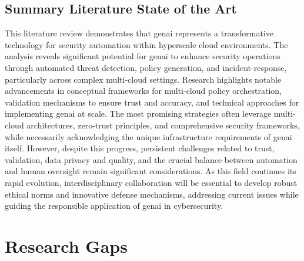 \subsection{Summary Literature State of the Art} %
\label{sec:Summary Literature State of the Art}

This literature review demonstrates that \gls{genai} represents a transformative technology for security automation within \gls{hyperscale} cloud environments. The analysis reveals significant potential for \gls{genai} to enhance security operations through automated threat detection, policy generation, and \gls{incident-response}, particularly across complex \gls{multi-cloud} settings. Research highlights notable advancements in conceptual frameworks for \gls{multi-cloud} policy orchestration, validation mechanisms to ensure trust and accuracy, and technical approaches for implementing \gls{genai} at scale. The most promising strategies often leverage \gls{multi-cloud} architectures, zero-trust principles, and comprehensive security frameworks, while necessarily acknowledging the unique infrastructure requirements of \gls{genai} itself. However, despite this progress, persistent challenges related to trust, validation, data privacy and quality, and the crucial balance between automation and human oversight remain significant considerations. As this field continues its rapid evolution, interdisciplinary collaboration will be essential to develop robust ethical norms and innovative defense mechanisms, addressing current issues while guiding the responsible application of \gls{genai} in cybersecurity.


\section{Research Gaps} %
\label{sec:Research Gaps}

